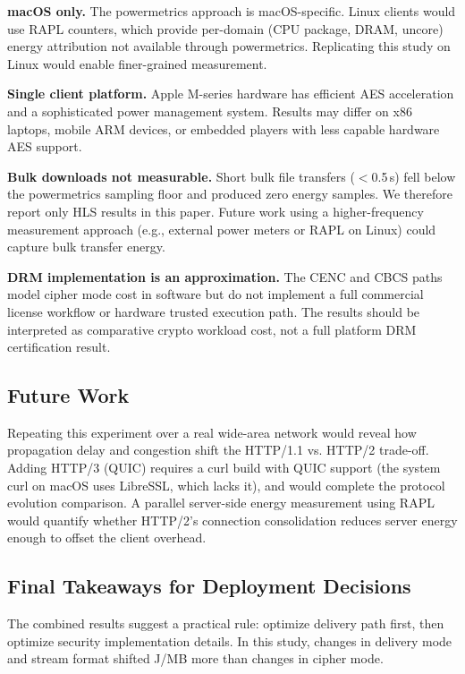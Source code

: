 \documentclass[conference]{IEEEtran}
\begin{document}
\textbf{macOS only.} The powermetrics approach is macOS-specific. Linux clients would
use RAPL counters, which provide per-domain (CPU package, DRAM, uncore) energy
attribution not available through powermetrics. Replicating this study on Linux would
enable finer-grained measurement.

\textbf{Single client platform.} Apple M-series hardware has efficient AES acceleration
and a sophisticated power management system. Results may differ on x86 laptops, mobile
ARM devices, or embedded players with less capable hardware AES support.

\textbf{Bulk downloads not measurable.} Short bulk file transfers ($<$0.5\,s) fell
below the powermetrics sampling floor and produced zero energy samples. We therefore
report only HLS results in this paper. Future work using a higher-frequency measurement
approach (e.g., external power meters or RAPL on Linux) could capture bulk transfer
energy.

\textbf{DRM implementation is an approximation.} The CENC and CBCS paths model cipher
mode cost in software but do not implement a full commercial license workflow or hardware
trusted execution path. The results should be interpreted as comparative crypto workload
cost, not a full platform DRM certification result.

\subsection{Future Work}

Repeating this experiment over a real wide-area network would reveal how propagation
delay and congestion shift the HTTP/1.1 vs. HTTP/2 trade-off. Adding HTTP/3 (QUIC)
requires a curl build with QUIC support (the system curl on macOS uses LibreSSL, which
lacks it), and would complete the protocol evolution comparison. A parallel server-side
energy measurement using RAPL would quantify whether HTTP/2's connection consolidation
reduces server energy enough to offset the client overhead.

\subsection{Final Takeaways for Deployment Decisions}

The combined results suggest a practical rule: optimize delivery path first, then optimize
security implementation details. In this study, changes in delivery mode and stream format
shifted J/MB more than changes in cipher mode.
\end{document}
